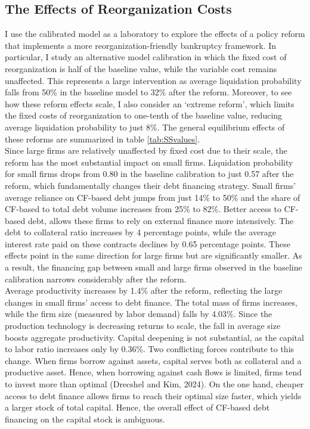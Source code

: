 \documentclass[12pt]{article}
\begin{document}
\subsection{The Effects of Reorganization Costs}
I use the calibrated model as a laboratory to explore the effects of a policy reform that implements a more reorganization-friendly bankruptcy framework. In particular, I study an alternative model calibration in which the fixed cost of reorganization is half of the baseline value, while the variable cost remains unaffected. This represents a large intervention as average liquidation probability falls from 50\% in the baseline model to 32\% after the reform. Moreover, to see how these reform effects scale, I also consider an `extreme reform', which limits the fixed costs of reorganization to one-tenth of the baseline value, reducing average liquidation probability to just 8\%. The general equilibrium effects of these reforms are summarized in table \ref{tab:SSvalues}. \vspace{3mm} \\ 
Since large firms are relatively unaffected by fixed cost due to their scale, the reform has the most substantial impact on small firms. Liquidation probability for small firms drops from 0.80 in the baseline calibration to just 0.57 after the reform, which fundamentally changes their debt financing strategy. Small firms' average reliance on CF-based debt jumps from just 14\% to 50\% and the share of CF-based to total debt volume increases from 25\% to 82\%. Better access to CF-based debt, allows these firms to rely on external finance more intensively. The debt to collateral ratio increases by 4 percentage points, while the average interest rate paid on these contracts declines by 0.65 percentage points. These effects point in the same direction for large firms but are significantly smaller. As a result, the financing gap between small and large firms observed in the baseline calibration narrows considerably after the reform. \vspace{3mm} \\ 
Average productivity increases by 1.4\% after the reform, reflecting the large changes in small firms' access to debt finance. The total mass of firms increases, while the firm size (measured by labor demand) falls by 4.03\%. Since the production technology is decreasing returns to scale, the fall in average size boosts aggregate productivity. Capital deepening is not substantial, as the capital to labor ratio increases only by 0.36\%. Two conflicting forces contribute to this change. When firms borrow against assets, capital serves both as collateral and a productive asset. Hence, when borrowing against cash flows is limited, firms tend to invest more than optimal (Drecshel and Kim, 2024). On the one hand, cheaper access to debt finance allows firms to reach their optimal size faster, which yields a larger stock of total capital. Hence, the overall effect of CF-based debt financing on the capital stock is ambiguous.
\end{document}
